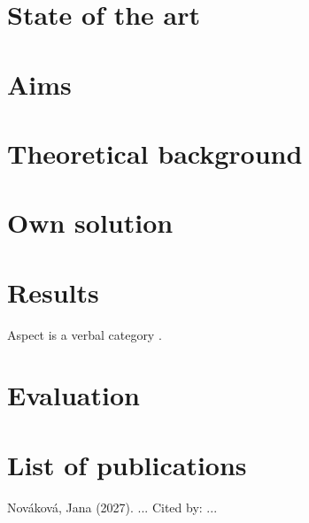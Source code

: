 \documentclass[department=kol, autoreferat, language=english, gender=f, bib=acl]{upolthesis}
\begin{document}
\makefrontmatter

\chapter{State of the art}
\chapter{Aims}
\chapter{Theoretical background}
\chapter{Own solution}
\chapter{Results}
Aspect is a verbal category \citep{Comrie:1976}.
\chapter{Evaluation}

\chapter*{List of publications}
Nováková, Jana (2027).  ...  Cited by: ...

\thesisbibliography
\end{document}
